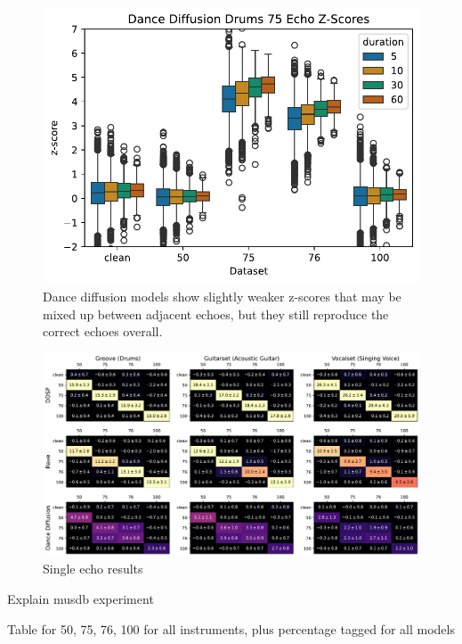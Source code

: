 \documentclass[letterpaper]{article} %
\begin{document}
\begin{figure}
    \centering
    \includegraphics[width=\columnwidth]{figs/DanceDiffusionZScoreExamples.pdf}
    \caption{Dance diffusion models show slightly weaker z-scores that may be mixed up between adjacent echoes, but they still reproduce the correct echoes overall.}
    \label{fig:dancediffusionzscoreexamples}
\end{figure}


\begin{figure}
    \centering
    \onecolumn
    \includegraphics[width=\textwidth]{figs/AllSingleEchoZScores.pdf}
    
    \caption{Single echo results}
    \label{fig:singleechotable}
    \twocolumn
\end{figure}


Explain musdb experiment

Table for 50, 75, 76, 100 for all instruments, plus percentage tagged for all models
\end{document}
